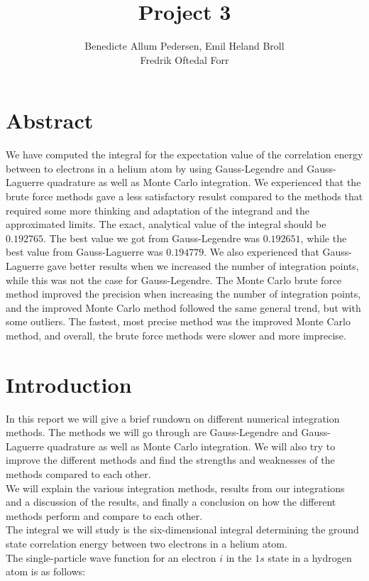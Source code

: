 \documentclass{article}
\title{Project 3}\vspace{-3ex}
\author{Benedicte Allum Pedersen, Emil Heland Broll\\ Fredrik Oftedal Forr}
\date{\vspace{-5ex}}
\begin{document}
\maketitle

\section*{Abstract}
	We have computed the integral for the expectation value of the correlation energy between to electrons in a helium atom by using Gauss-Legendre and Gauss-Laguerre quadrature as well as Monte Carlo integration. We experienced that the brute force methods gave a less satisfactory resulst compared to the methods that required some more thinking and adaptation of the integrand and the approximated limits. The exact, analytical value of the integral should be $0.192765$. The best value we got from Gauss-Legendre was $0.192651$, while the best value from Gauss-Laguerre was $0.194779$. We also experienced that Gauss-Laguerre gave better results when we increased the number of integration points, while this was not the case for Gauss-Legendre.
	The Monte Carlo brute force method improved the precision when increasing the number of integration points, and the improved Monte Carlo method followed the same general trend, but with some outliers.
	The fastest, most precise method was the improved Monte Carlo method, and overall, the brute force methods were slower and more imprecise.

\section*{Introduction}
	In this report we will give a brief rundown on different numerical integration methods. The methods we will go through are Gauss-Legendre and Gauss-Laguerre quadrature as well as Monte Carlo integration. We will also try to improve the different methods and find the strengths and weaknesses of the methods compared to each other.\\
	We will explain the various integration methods, results from our integrations and a discussion of the results, and finally a conclusion on how the different methods perform and compare to each other.\\

	The integral we will study is the six-dimensional integral determining the ground state correlation energy between two electrons in a helium atom.\\

	The single-particle wave function for an electron $i$ in the $1s$ state in a hydrogen atom is as follows:
\end{document}
